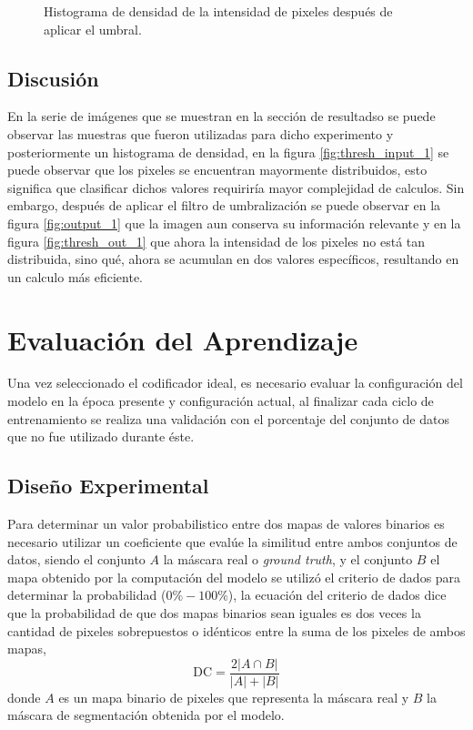 \begin{figure}[!ht]
\begin{tabular}{ccc}
    \end{tabular}        
    \caption{Histograma de densidad de la intensidad de pixeles después de aplicar el umbral.}
    \label{fig:thresh_out_2}
\end{figure}

\subsection{Discusión}
En la serie de imágenes que se muestran en la sección de resultadso se puede observar las muestras que fueron utilizadas para dicho experimento y posteriormente un histograma de densidad, en la figura \ref{fig:thresh_input_1} se puede observar que los pixeles se encuentran mayormente distribuidos, esto significa que clasificar dichos valores requiriría mayor complejidad de calculos. Sin embargo, después de aplicar el filtro de umbralización se puede observar en la figura \ref{fig:output_1} que la imagen aun conserva su información relevante y en la figura \ref{fig:thresh_out_1} que ahora la intensidad de los pixeles no está tan distribuida, sino qué, ahora se acumulan en dos valores específicos, resultando en un calculo más eficiente.

\clearpage

\section{Evaluación del Aprendizaje}
Una vez seleccionado el codificador ideal, es necesario evaluar la configuración del modelo en la época presente y configuración actual, al finalizar cada ciclo de entrenamiento se realiza una validación con el porcentaje del conjunto de datos que no fue utilizado durante éste.
\subsection{Diseño Experimental}
Para determinar un valor probabilistico entre dos mapas de valores binarios es necesario utilizar un coeficiente que evalúe la similitud entre ambos conjuntos de datos, siendo el conjunto $A$ la máscara real o \emph{ground truth}, y el conjunto $B$ el mapa obtenido por la computación del modelo se utilizó el criterio de dados para determinar la probabilidad ($0 \% - 100 \%$), la ecuación del criterio de dados dice que la probabilidad de que dos mapas binarios sean iguales es dos veces la cantidad de pixeles sobrepuestos o idénticos entre la suma de los pixeles de ambos mapas, 
\begin{equation}\label{eq:diceloss}
    \text{DC} = \frac{2|A \cap B |}{|A| + |B|}
\end{equation}
donde $A$ es un mapa binario de pixeles que representa la máscara real y $B$ la máscara de segmentación obtenida por el modelo.

